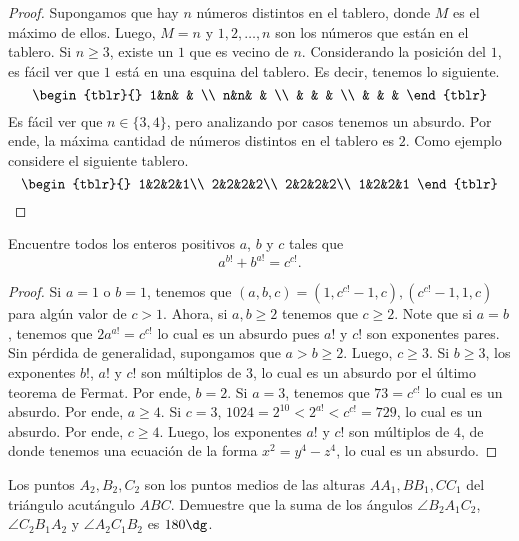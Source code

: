 \begin{proof}
	Supongamos que hay $n$ números distintos en el tablero, donde $M$ es el máximo de ellos. Luego, $M=n$ y $1,2,\dots,n$ son los números que están en el tablero. Si $n\ge 3$, existe un $1$ que es vecino de $n$. Considerando la posición del $1$, es fácil ver que $1$ está en una esquina del tablero. Es decir, tenemos lo siguiente.
	\[\begin{tblr}{}
		1&n& & \\
		n&n& & \\
		 & & & \\
		 & & &
	\end{tblr}\]
	Es fácil ver que $n\in\{3,4\}$, pero analizando por casos tenemos un absurdo. Por ende, la máxima cantidad de números distintos en el tablero es $2$. Como ejemplo considere el siguiente tablero.
	\[\begin{tblr}{}
		1&2&2&1\\
		2&2&2&2\\
		2&2&2&2\\
		1&2&2&1
	\end{tblr}\]
\end{proof}

\begin{probEG}
	Encuentre todos los enteros positivos $a$, $b$ y $c$ tales que
	\[a^{b!}+b^{a!}=c^{c!}.\]
\end{probEG}

\begin{proof}
	Si $a=1$ o $b=1$, tenemos que $(a,b,c)=\left(1,c^{c!}-1,c\right),\left(c^{c!}-1,1,c\right)$ para algún valor de $c>1$. Ahora, si $a,b\ge 2$ tenemos que $c\ge 2$. Note que si $a=b$, tenemos que $2a^{a!}=c^{c!}$ lo cual es un absurdo pues $a!$ y $c!$ son exponentes pares. Sin pérdida de generalidad, supongamos que $a>b\ge 2$. Luego, $c\ge 3$. Si $b\ge 3$, los exponentes $b!$, $a!$ y $c!$ son múltiplos de $3$, lo cual es un absurdo por el último teorema de Fermat. Por ende, $b=2$. Si $a=3$, tenemos que $73=c^{c!}$ lo cual es un absurdo. Por ende, $a\ge 4$. Si $c=3$, $1024=2^{10}<2^{a!}<c^{c!}=729$, lo cual es un absurdo. Por ende, $c\ge 4$. Luego, los exponentes $a!$ y $c!$ son múltiplos de $4$, de donde tenemos una ecuación de la forma $x^2=y^4-z^4$, lo cual es un absurdo.
\end{proof}

\begin{probEG}
	Los puntos $A_2,B_2,C_2$ son los puntos medios de las alturas $AA_1,BB_1,CC_1$ del triángulo acutángulo $ABC$. Demuestre que la suma de los ángulos $\angle B_2A_1C_2$, $\angle C_2B_1A_2$ y $\angle A_2C_1B_2$ es $180\dg$.
\end{probEG}

